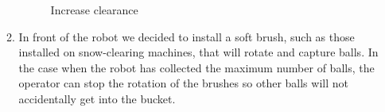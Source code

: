 \begin{enumerate}
\begin{enumerate}
		\begin{figure}[H]
			\begin{minipage}[h]{1\linewidth}
				\caption{Increase clearance} 
			\end{minipage}
		\end{figure}
		
		\item In front of the robot we decided to install a soft brush, such as those installed on snow-clearing machines, that will rotate and capture balls. In the case when the robot has collected the maximum number of balls, the operator can stop the rotation of the brushes so other balls will not accidentally get into the bucket.
		

\end{enumerate}
\end{enumerate}
